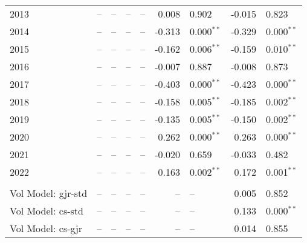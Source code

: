\documentclass[12pt]{article}
\begin{document}
\begin{table}[!ht]
\begin{tabular}{l r l r l r l r l}
        2013                         &      -- & --           &      -- & --            &       0.008 & 0.902          &  -0.015 & 0.823          \\
        2014                         &      -- & --           &      -- & --            &      -0.313 & 0.000$^{**}$   &  -0.329 & 0.000$^{**}$   \\
        2015                         &      -- & --           &      -- & --            &      -0.162 & 0.006$^{**}$   &  -0.159 & 0.010$^{**}$   \\
        2016                         &      -- & --           &      -- & --            &      -0.007 & 0.887          &  -0.008 & 0.873          \\
        2017                         &      -- & --           &      -- & --            &      -0.403 & 0.000$^{**}$   &  -0.423 & 0.000$^{**}$   \\
        2018                         &      -- & --           &      -- & --            &      -0.158 & 0.005$^{**}$   &  -0.185 & 0.002$^{**}$   \\
        2019                         &      -- & --           &      -- & --            &      -0.135 & 0.005$^{**}$   &  -0.150 & 0.002$^{**}$   \\
        2020                         &      -- & --           &      -- & --            &       0.262 & 0.000$^{**}$   &   0.263 & 0.000$^{**}$   \\
        2021                         &      -- & --           &      -- & --            &      -0.020 & 0.659          &  -0.033 & 0.482          \\
        2022                         &      -- & --           &      -- & --            &       0.163 & 0.002$^{**}$   &   0.172 & 0.001$^{**}$   \\
                                                                                                                                                  \\
        Vol Model: gjr-std           &      -- & --           &      -- & --            &          -- & --             &   0.005 & 0.852          \\
        Vol Model: cs-std            &      -- & --           &      -- & --            &          -- & --             &   0.133 & 0.000$^{**}$   \\
        Vol Model: cs-gjr            &      -- & --           &      -- & --            &          -- & --             &   0.014 & 0.855          \\

\end{tabular}
\end{table}
\end{document}
